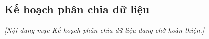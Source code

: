 
\subsection{Kế hoạch phân chia dữ liệu}\label{subsec:phan-chia-du-lieu}

\textit{[Nội dung mục Kế hoạch phân chia dữ liệu đang chờ hoàn thiện.]}
